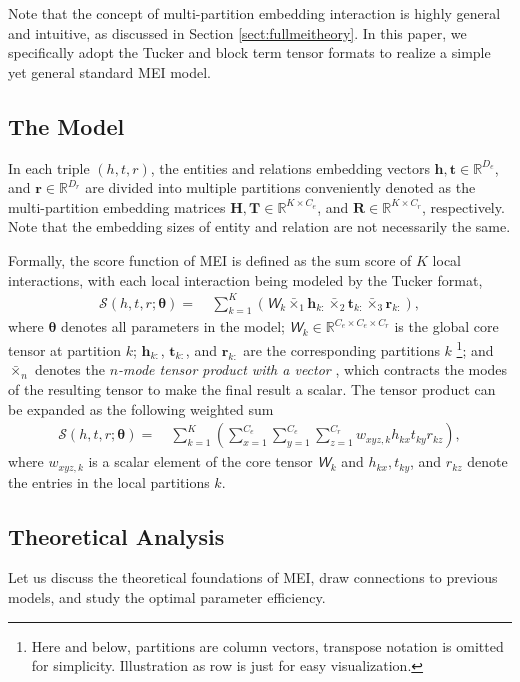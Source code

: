 \documentclass{ecai}
\def\vh{{\bm{h}}}
\def\vr{{\bm{r}}}
\def\vt{{\bm{t}}}
\def\mH{{\bm{H}}}
\def\mR{{\bm{R}}}
\def\mT{{\bm{T}}}
\newcommand{\tens}[1]{\bm{\mathsfit{#1}}}
\def\tW{{\tens{W}}}
\def\gS{{\mathcal{S}}}
\def\sR{{\mathbb{R}}}
\theoremstyle{plain}  \newtheorem{thm}{Theorem}  \newtheorem{lem}[thm]{Lemma}  \newtheorem{prop}[thm]{Proposition}
\theoremstyle{remark}  \newtheorem*{rem}{Remark}
\begin{document}
Note that the concept of multi-partition embedding interaction is highly general and intuitive, as discussed in Section \ref{sect:fullmeitheory}. In this paper, we specifically adopt the Tucker and block term tensor formats to realize a simple yet general standard MEI model.

\subsection{The Model}
In each triple $ (h, t, r) $, the entities and relations embedding vectors $ \vh, \vt \in \sR^{D_e} $, and $ \vr \in \sR^{D_r} $ are divided into multiple partitions conveniently denoted as the multi-partition embedding matrices $ \mH, \mT \in \sR^{K \times C_e} $, and $ \mR \in \sR^{K \times C_r} $, respectively. Note that the embedding sizes of entity and relation are not necessarily the same. 

Formally, the score function of MEI is defined as the sum score of $ K $ local interactions, with each local interaction being modeled by the Tucker format, 
\begin{align}
\gS (h,t,r;\bm{\theta}) =\ &\sum_{k = 1}^{K} \left( \tW_k \bar{\times}_1 \vh_{k:} \bar{\times}_2 \vt_{k:} \bar{\times}_3 \vr_{k:} \right), \label{eq:scoremeitensorproduct}
\end{align}
where $ \bm{\theta} $ denotes all parameters in the model; $ \tW_k \in \sR^{C_e \times C_e \times C_r} $ is the global core tensor at partition $ k $; $ \vh_{k:} $, $ \vt_{k:} $, and $ \vr_{k:} $ are the corresponding partitions $ k $ \footnote{Here and below, partitions are column vectors, transpose notation is omitted for simplicity. Illustration as row is just for easy visualization.}; and $ \bar{\times}_n $ denotes the \textit{$ n $-mode tensor product with a vector} \cite{kolda_tensordecompositionsapplications_2009}, which contracts the modes of the resulting tensor to make the final result a scalar. The tensor product can be expanded as the following weighted sum
\begin{align}
\gS (h,t,r;\bm{\theta}) =\ &\sum_{k = 1}^{K} \left( \sum_{x = 1}^{C_e} \sum_{y = 1}^{C_e} \sum_{z = 1}^{C_r} w_{xyz, k} h_{kx} t_{ky} r_{kz} \right) \label{eq:scoremeitensorsum},
\end{align}
where $ w_{xyz, k} $ is a scalar element of the core tensor $ \tW_k $ and $ h_{kx}, t_{ky} $, and $ r_{kz} $ denote the entries in the local partitions $ k $.

\subsection{Theoretical Analysis} \label{sect:theory} Let us discuss the theoretical foundations of MEI, draw connections to previous models, and study the optimal parameter efficiency.
\end{document}

